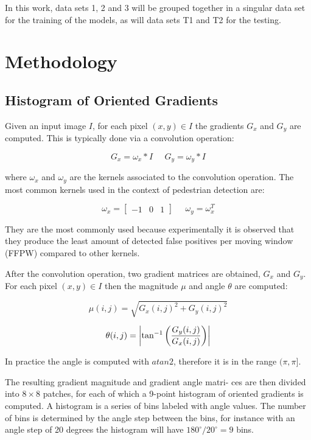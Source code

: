 \documentclass[journal,twocolumn]{IEEEtran}
\begin{document}
In this work, data sets 1, 2 and 3 will be grouped together in a singular data set for the training of the models, as will data sets T1 and T2 for the testing.

\section{Methodology}
\label{sec:meth}

\subsection{Histogram of Oriented Gradients}

Given an input image $I$, for each pixel $(x,y)\in I$ the gradients $G_x$ and $G_y$ are computed. This is typically done via a convolution operation:

\begin{equation}
G_x=\omega_x* I\;\;\;\;\;G_y=\omega_y* I
\end{equation}

where $\omega_x$ and $\omega_y$ are the kernels associated to the convolution operation. The most common kernels used in the context of pedestrian detection are:

\begin{equation*}
\omega_x=\begin{bmatrix}
-1 & 0 & 1
\end{bmatrix}\;\;\;\;\;\omega_y=\omega_x^T
\end{equation*}

They are the most commonly used because experimentally it is observed\cite{2} that they produce the least amount of detected false positives per moving window (FFPW) compared to other kernels.

After the convolution operation, two gradient matrices are obtained, $G_x$ and $G_y$. For each pixel $(x,y)\in I$ then the magnitude $\mu$ and angle $\theta$ are computed:

\begin{equation}
\mu(i,j)=\sqrt{G_x(i,j)^2+G_y(i,j)^2}
\end{equation}

\begin{equation*}
\theta(i,j)=\abs{\tan^{-1}\left(\frac{G_y(i,j)}{G_x(i,j)}\right)}
\end{equation*}

In practice the angle is computed with $atan2$, therefore it is in the range $(\pi,\pi]$.

The resulting gradient magnitude and gradient angle matri-
ces are then divided into $8\times 8$ patches, for each of which a 9-point histogram of oriented gradients is computed. A
histogram is a series of bins labeled with angle values. The
number of bins is determined by the angle step between
the bins, for instance with an angle step of 20 degrees the
histogram will have $180^\circ/20^\circ = 9$ bins.
\end{document}
